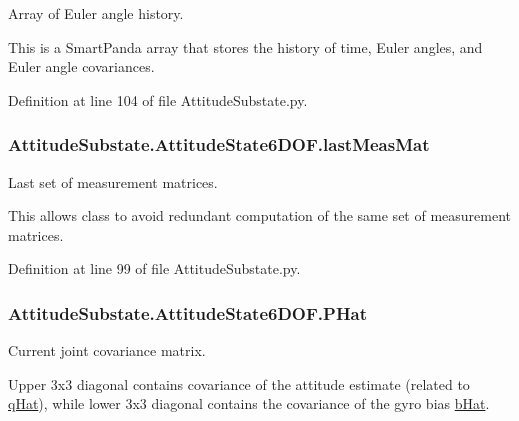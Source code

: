 Array of Euler angle history. 

This is a Smart\+Panda array that stores the history of time, Euler angles, and Euler angle covariances. 

Definition at line 104 of file Attitude\+Substate.\+py.

\subsubsection[{\texorpdfstring{last\+Meas\+Mat}{lastMeasMat}}]{\setlength{\rightskip}{0pt plus 5cm}Attitude\+Substate.\+Attitude\+State6\+D\+O\+F.\+last\+Meas\+Mat}\hypertarget{classAttitudeSubstate_1_1AttitudeState6DOF_ae23a47fae330703aa8a50b207275c9b0}{}\label{classAttitudeSubstate_1_1AttitudeState6DOF_ae23a47fae330703aa8a50b207275c9b0}


Last set of measurement matrices. 

This allows class to avoid redundant computation of the same set of measurement matrices. 

Definition at line 99 of file Attitude\+Substate.\+py.

\subsubsection[{\texorpdfstring{P\+Hat}{PHat}}]{\setlength{\rightskip}{0pt plus 5cm}Attitude\+Substate.\+Attitude\+State6\+D\+O\+F.\+P\+Hat}\hypertarget{classAttitudeSubstate_1_1AttitudeState6DOF_a6aac27efa4d5962865f7d3f701c919ab}{}\label{classAttitudeSubstate_1_1AttitudeState6DOF_a6aac27efa4d5962865f7d3f701c919ab}


Current joint covariance matrix. 

Upper 3x3 diagonal contains covariance of the attitude estimate (related to \hyperlink{classAttitudeSubstate_1_1AttitudeState6DOF_a36a58a47280151dd544762d9a1d5c35d}{q\+Hat}), while lower 3x3 diagonal contains the covariance of the gyro bias \hyperlink{classAttitudeSubstate_1_1AttitudeState6DOF_a1b8eff7c89a7a03875dc04263da7ec18}{b\+Hat}. 

